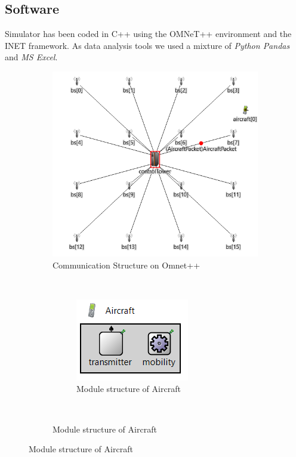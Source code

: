 \documentclass[a4paper,12pt]{article}
\begin{document}
\subsection{Software}
Simulator has been coded in C++ using the OMNeT++ environment and the INET framework. As data analysis tools we used a mixture of \textit{Python Pandas} and \textit{MS Excel}.
\begin{figure}[H]
  \centering
  \begin{subfigure}[b]{0.45\textwidth}
    \centering
    \includegraphics[scale=0.65]{img/Implementation.png}
    \caption{Communication Structure on Omnet++}
    \label{fig:aircraft-ned}
  \end{subfigure}
  ~
  \begin{subfigure}[b]{.45\textwidth}
    \begin{subfigure}[b]{\textwidth}
        \centering
        \includegraphics{img/aircraft-ned.png}
        \caption{Module structure of Aircraft}
        \label{fig:aircraft-ned}
    \end{subfigure}
    \\

\end{subfigure}
\end{figure}
\end{document}
